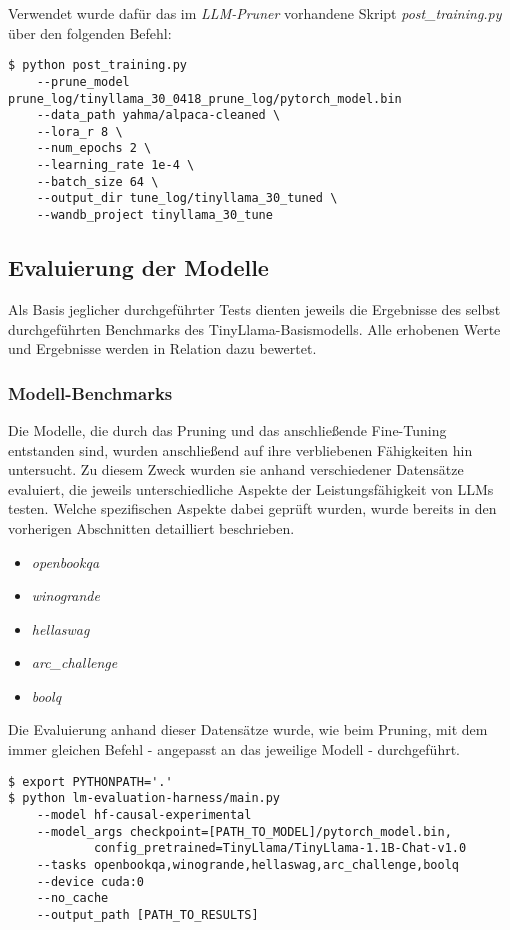 Verwendet wurde dafür das im \emph{LLM-Pruner} vorhandene Skript
\emph{post\_training.py} über den folgenden Befehl:

\vspace{1em}
\begin{lstlisting}
$ python post_training.py 
    --prune_model prune_log/tinyllama_30_0418_prune_log/pytorch_model.bin
    --data_path yahma/alpaca-cleaned \
    --lora_r 8 \
    --num_epochs 2 \ 
    --learning_rate 1e-4 \ 
    --batch_size 64 \
    --output_dir tune_log/tinyllama_30_tuned \ 
    --wandb_project tinyllama_30_tune
\end{lstlisting}


\subsection{Evaluierung der Modelle}

Als Basis jeglicher durchgeführter Tests dienten jeweils die Ergebnisse des
selbst durchgeführten Benchmarks des TinyLlama-Basismodells. Alle erhobenen
Werte und Ergebnisse werden in Relation dazu bewertet.

\subsubsection{Modell-Benchmarks}

Die Modelle, die durch das Pruning und das anschließende Fine-Tuning entstanden
sind, wurden anschließend auf ihre verbliebenen Fähigkeiten hin untersucht. Zu
diesem Zweck wurden sie anhand verschiedener Datensätze evaluiert, die jeweils
unterschiedliche Aspekte der Leistungsfähigkeit von LLMs testen. Welche
spezifischen Aspekte dabei geprüft wurden, wurde bereits in den vorherigen
Abschnitten detailliert beschrieben.

\begin{itemize}
	\item{\emph{openbookqa}}
	\item{\emph{winogrande}}
	\item{\emph{hellaswag}}
	\item{\emph{arc\_challenge}}
	\item{\emph{boolq}}
\end{itemize}

Die Evaluierung anhand dieser Datensätze wurde, wie beim Pruning, mit dem immer
gleichen Befehl - angepasst an das jeweilige Modell - durchgeführt.

\vspace{1em}
\begin{lstlisting}
$ export PYTHONPATH='.'
$ python lm-evaluation-harness/main.py
    --model hf-causal-experimental
    --model_args checkpoint=[PATH_TO_MODEL]/pytorch_model.bin,
            config_pretrained=TinyLlama/TinyLlama-1.1B-Chat-v1.0
    --tasks openbookqa,winogrande,hellaswag,arc_challenge,boolq
    --device cuda:0
    --no_cache
    --output_path [PATH_TO_RESULTS]
\end{lstlisting}


